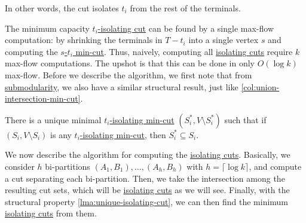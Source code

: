 \begin{intuition}
	In other words, the cut isolates \(t_i\) from the rest of the terminals.
\end{intuition}

The minimum capacity \hyperref[prb:isolating-cut]{\(t_i\)-isolating cut} can be found by a single max-flow computation: by shrinking the terminals in \(T - t_i\) into a single vertex \(s\) and computing the \hyperref[prb:s-t-min-cut]{\(s\)-\(t_i\) min-cut}. Thus, naively, computing all \hyperref[prb:isolating-cut]{isolating cuts} require \(k\) max-flow computations. The upshot is that this can be done in only \(O(\log k)\) max-flow. Before we describe the algorithm, we first note that from \hyperref[def:submodular]{submodularity}, we also have a similar structural result, just like \autoref{col:union-intersection-min-cut}.

\begin{lemma}\label{lma:unique-isolating-cut}
	There is a unique minimal \hyperref[prb:isolating-cut]{\(t_i\)-isolating min-cut} \((S_i^{\ast} , V \setminus S_i^{\ast} )\) such that if \((S_i, V\setminus S_i)\) is any \hyperref[prb:isolating-cut]{\(t_i\)-isolating min-cut}, then \(S_i^{\ast} \subseteq S_i\).
\end{lemma}

We now describe the algorithm for computing the \hyperref[prb:isolating-cut]{isolating cuts}. Basically, we consider \(h\) bi-partitions \((A_1, B_1), \dots , (A_h, B_h )\) with \(h = \lceil \log k \rceil \), and compute a cut separating each bi-partition. Then, we take the intersection among the resulting cut sets, which will be \hyperref[prb:isolating-cut]{isolating cuts} as we will see. Finally, with the structural property \autoref{lma:unique-isolating-cut}, we can then find the minimum \hyperref[prb:isolating-cut]{isolating cuts} from them.

